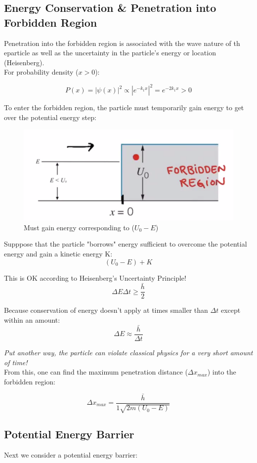 \documentclass[class=article,crop=false]{standalone}
\begin{document}
\subsection{Energy Conservation \& Penetration into Forbidden Region}
Penetration into the forbidden region is associated with the wave nature of th eparticle as well as the uncertainty in the particle's energy or location (Heisenberg).\\

For probability density ($x > 0$):

$$ P(x) = |\psi(x)|^2 \propto |e^{-k_1x}|^2 = e^{-2k_1x} > 0 $$

To enter the forbidden region, the particle must temporarily gain energy to get over the potential energy step:

\begin{figure}[h!]
	\centering
	\includegraphics[width=0.6\linewidth]{./Images/forbidden_region.png}
	\caption{Must gain energy corresponding to ($U_0 - E$)}
\end{figure}

Supppose that the particle "borrows" energy sufficient to overcome the potential energy and gain a kinetic energy K:
$$ (U_0 - E) + K $$

This is OK according to Heisenberg's Uncertainty Principle!
$$ \Delta E \Delta t \geq \frac{\bar{h}}{2} $$

Because conservation of energy doesn't apply at times smaller than $\Delta t$ except within an amount:
$$ \Delta E \approx \frac{\bar{h}}{\Delta t} $$

\emph{Put another way, the particle can violate classical physics for a very short amount of time!} \\

From this, one can find the maximum penetration distance ($\Delta x_{max}$) into the forbidden region:

$$ \Delta x_{max} = \frac{\bar{h}}{1\sqrt{2m(U_0 - E)}} $$

\subsection{Potential Energy Barrier}
Next we consider a potential energy barrier:
\end{document}
